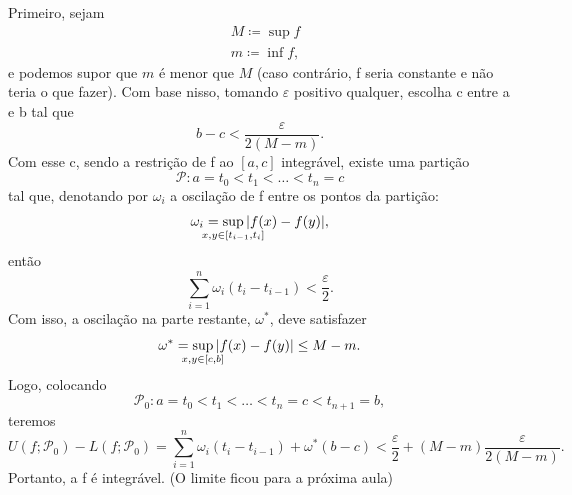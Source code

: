 \documentclass[../analysisII_notes.tex]{subfiles}
\begin{document}
\begin{proof*}
	Primeiro, sejam
	\begin{align*}
		 & M \coloneqq \sup_{}f  \\
		 & m \coloneqq \inf_{}f,
	\end{align*}
	e podemos supor que \(m\) é menor que \(M\) (caso contrário, f seria constante e não teria o que fazer). Com base nisso, tomando \(\varepsilon \) positivo qualquer, escolha c entre a e b tal que
	\[
		b-c < \frac{\varepsilon }{2(M-m)}.
	\]
	Com esse c, sendo a restrição de f ao \([a, c]\) integrável, existe uma partição
	\[
		\mathcal{P}: a = t_{0} < t_{1} < \dotsc < t_{n} = c
	\]
	tal que, denotando por \(\omega_{i}\) a oscilação de f entre os pontos da partição:
	\[
		\omega_{i} = \sup_{\mathclap{x, y\in [t_{i-1}, t_{i}]}}|f(x)-f(y)|,
	\]
	então
	\[
		\sum\limits_{i=1}^{n}\omega_{i}(t_{i}-t_{i-1})<\frac{\varepsilon }{2}.
	\]
	Com isso, a oscilação na parte restante, \(\omega^{*}\), deve satisfazer
	\[
		\omega^{*}= \sup_{\mathclap{x, y\in [c, b]}}|f(x)-f(y)|\leq M-m.
	\]
	Logo, colocando
	\[
		\mathcal{P}_{0}: a = t_{0} < t_1 <\dotsc <t_{n} = c < t_{n+1} = b,
	\]
	teremos
	\[
		U(f; \mathcal{P}_{0}) - L(f; \mathcal{P}_{0}) = \sum\limits_{i=1}^{n}\omega_{i}(t_{i}-t_{i-1}) + \omega^{*}(b-c) < \frac{\varepsilon }{2} + (M-m)\frac{\varepsilon }{2(M-m)}.
	\]
	Portanto, a f é integrável. (O limite ficou para a próxima aula) \qedsymbol
\end{proof*}
\end{document}
